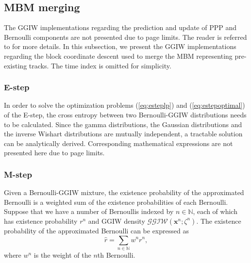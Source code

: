 \documentclass[journal]{IEEEtran}
\begin{document}
\subsection{MBM merging}
The GGIW implementations regarding the prediction and update of PPP and Bernoulli components are not presented due to page limits. The reader is referred to \cite{pmbmextended,pmbmextended2} for more details. In this subsection, we present the GGIW implementations regarding the block coordinate descent used to merge the MBM representing pre-existing tracks. The time index is omitted for simplicity.

\subsubsection{E-step}
In order to solve the optimization problems (\ref{eq:esteplp}) and (\ref{eq:estepoptimal}) of the E-step, the cross entropy between two Bernoulli-GGIW distributions needs to be calculated. Since the gamma distributions, the Gaussian distributions and the inverse Wishart distributions are mutually independent, a tractable solution can be analytically derived. Corresponding mathematical expressions are not presented here due to page limits. 

\subsubsection{M-step}
Given a Bernoulli-GGIW mixture, the existence probability of the approximated Bernoulli is a weighted sum of the existence probabilities of each Bernoulli. Suppose that we have a number of Bernoullis indexed by $n\in\mathbb{N}$, each of which has existence probability $r^n$ and GGIW density $\mathcal{GGIW}(\mathbf{x}^n;\zeta^n)$. The existence probability of the approximated Bernoulli can be
expressed as
\begin{equation}
    \hat{r} = \sum_{n\in\mathbb{N}} w^nr^n,
\end{equation}
where $w^n$ is the weight of the $n$th Bernoulli. 
\end{document}
